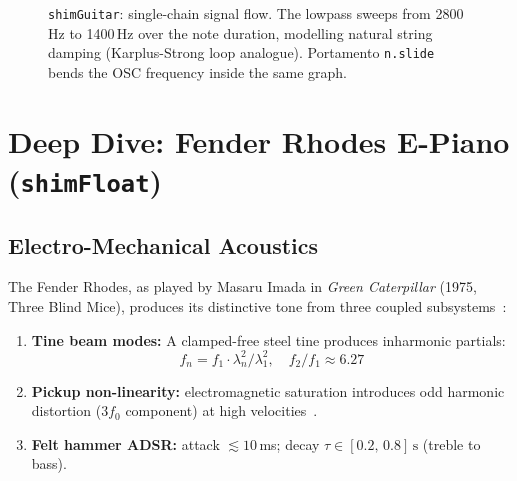 \documentclass[10pt,journal,compsoc,twocolumn]{article}
\begin{document}
\begin{figure}[t]
\centering
{}
\caption{\texttt{shimGuitar}: single-chain signal flow.
         The lowpass sweeps from 2800\,Hz to 1400\,Hz over the note
         duration, modelling natural string damping (Karplus-Strong loop
         analogue). Portamento \texttt{n.slide} bends the OSC frequency
         inside the same graph.}
\label{fig:guitar_flow}
\end{figure}

\section{Deep Dive: Fender Rhodes E-Piano (\texttt{shimFloat})}
\label{sec:rhodes}

\subsection{Electro-Mechanical Acoustics}

The Fender Rhodes, as played by Masaru Imada in \emph{Green Caterpillar}
(1975, Three Blind Mice), produces its distinctive tone from three coupled
subsystems~\cite{bank2010parametric,petersen2011rhodes}:

\begin{enumerate}[leftmargin=*]
    \item \textbf{Tine beam modes:} A clamped-free steel tine produces
    inharmonic partials:
    \begin{equation}
    f_n = f_1 \cdot \lambda_n^2/\lambda_1^2,\quad
    f_2/f_1 \approx 6.27
    \label{eq:tine}
    \end{equation}

    \item \textbf{Pickup non-linearity:} electromagnetic saturation introduces
    odd harmonic distortion ($3f_0$ component) at high
    velocities~\cite{bank2010parametric}.

    \item \textbf{Felt hammer ADSR:} attack $\lesssim 10$\,ms; decay
    $\tau \in [0.2,\,0.8]\,\text{s}$ (treble to bass).
\end{enumerate}
\end{document}
